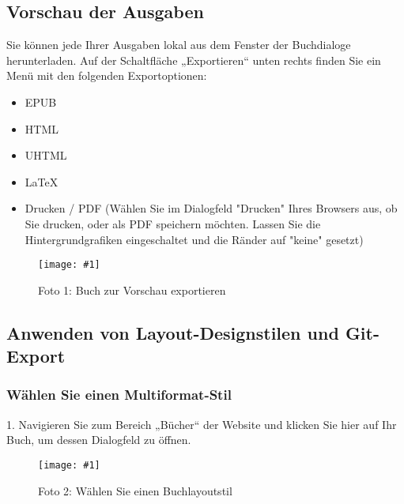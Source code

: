 \documentclass{article}
\newlength{\imgwidth}
\newcommand\scaledgraphics[2]{%
                
\settowidth{\imgwidth}{\texttt{[image: \#1]}}%
                
\setlength{\imgwidth}{\minof{\imgwidth}{#2\textwidth}}%
                
\texttt{[image: \#1]}%
                
}
\begin{document}
\subsection{Vorschau der Ausgaben}\label{H2960848}



Sie können jede Ihrer Ausgaben lokal aus dem Fenster der Buchdialoge herunterladen. Auf der Schaltfläche „Exportieren“ unten rechts finden Sie ein Menü mit den folgenden Exportoptionen:

\begin{itemize}
\item EPUB


\item HTML


\item UHTML


\item LaTeX


\item Drucken / PDF (Wählen Sie im Dialogfeld "Drucken" Ihres Browsers aus, ob Sie drucken, oder als PDF speichern möchten. Lassen Sie die Hintergrundgrafiken eingeschaltet und die Ränder auf "keine" gesetzt)


\end{itemize}
\begin{figure}
\scaledgraphics{d0eba562-a5b7-49ad-a5ca-0588aeabc968.png}{1}
\caption*{Foto 1: Buch zur Vorschau exportieren}\label{F72393411}
\end{figure}


\subsection{Anwenden von Layout-Designstilen und Git-Export}\label{H4196815}



\subsubsection{Wählen Sie einen Multiformat-Stil}\label{H3054847}



1. Navigieren Sie zum Bereich „Bücher“ der Website und klicken Sie hier auf Ihr Buch, um dessen Dialogfeld zu öffnen.

\begin{figure}
\scaledgraphics{255a3f43-9cd0-4af1-b087-623a55474e14.png}{1}
\caption*{Foto 2: Wählen Sie einen Buchlayoutstil}\label{F57417271}
\end{figure}
\end{document}
